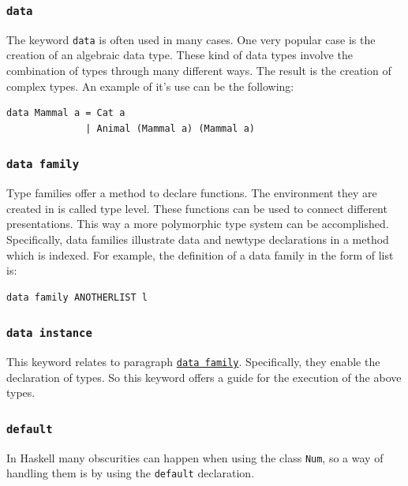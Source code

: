 \documentclass[a4paper, titlepage, twoside]{article}
\begin{document}
\subsubsection{\texttt{data}}
\label{sec:org6b982e7}

The keyword \texttt{data} is often used in many cases. One very popular case is the creation of an algebraic data type. These kind of data types involve the combination of types through many different ways. The result is the creation of complex types. An example of it's use can be the following:

\begin{verbatim}
data Mammal a = Cat a
              | Animal (Mammal a) (Mammal a)
\end{verbatim}

\subsubsection{\texttt{data family}}
\label{sec:org06cb5c6}

Type families offer a method to declare functions. The environment they are created in is called type level. These functions can be used to connect different presentations. This way a more polymorphic type system can be accomplished. Specifically, data families illustrate data and newtype declarations in a method which is indexed. For example, the definition of a data family in the form of list is:

\begin{verbatim}
data family ANOTHERLIST l
\end{verbatim}

\subsubsection{\texttt{data instance}}
\label{sec:org923e6a1}

This keyword relates to paragraph \hyperref[sec:org06cb5c6]{\texttt{data family}}. Specifically, they enable the declaration of types. So this keyword offers a guide for the execution of the above types.

\subsubsection{\texttt{default}}
\label{sec:org3b9873d}

In Haskell many obscurities can happen when using the class \texttt{Num}, so a way of handling them is by using the \texttt{default} declaration.
\end{document}
